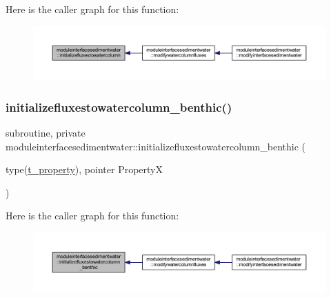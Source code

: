 Here is the caller graph for this function\+:\nopagebreak
\begin{figure}[H]
\begin{center}
\leavevmode
\includegraphics[width=350pt]{namespacemoduleinterfacesedimentwater_ad957168b604568b1c6165e52a78a03c6_icgraph}
\end{center}
\end{figure}
\mbox{\label{namespacemoduleinterfacesedimentwater_a255d03cbe0cabfd03178e57925298607}} 
\subsubsection{\texorpdfstring{initializefluxestowatercolumn\+\_\+benthic()}{initializefluxestowatercolumn\_benthic()}}
{\footnotesize\ttfamily subroutine, private moduleinterfacesedimentwater\+::initializefluxestowatercolumn\+\_\+benthic (\begin{DoxyParamCaption}\item[{type(\mbox{\hyperlink{structmoduleinterfacesedimentwater_1_1t__property}{t\+\_\+property}}), pointer}]{PropertyX }\end{DoxyParamCaption})\hspace{0.3cm}{\ttfamily [private]}}

Here is the caller graph for this function\+:\nopagebreak
\begin{figure}[H]
\begin{center}
\leavevmode
\includegraphics[width=350pt]{namespacemoduleinterfacesedimentwater_a255d03cbe0cabfd03178e57925298607_icgraph}
\end{center}
\end{figure}
\mbox{\label{namespacemoduleinterfacesedimentwater_a692292c5eb96b9de096ef130fafc0962}} 

